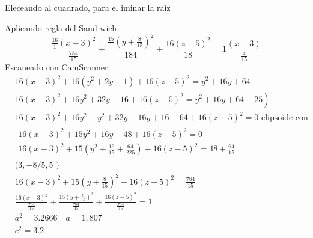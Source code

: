 Eleceando al cuadrado, para el iminar la raíz

Aplicando regla del Sand wich
$$
\frac{\frac{16}{1}(x-3)^2}{\frac{784}{15}}+\frac{\frac{15}{1}\left(y+\frac{8}{15}\right)^2}{184}+\frac{16(z-5)^2}{18}=1 \frac{(x-3)}{\frac{4}{15}}
$$
Escaneado con CamScanner
$$
\begin{aligned}
	& 16(x-3)^2+16\left(y^2+2 y+1\right)+16(z-5)^2=y^2+16 y+64 \\
	& \left.16(x-3)^2+16 y^2+32 y+16+16(z-5)^2=y^2+16 y+64+25\right) \\
	& 16(x-3)^2+16 y^2-y^2+32 y-16 y+16-64+16(z-5)^2=0 \text { elipsoide con } \\
	& \begin{array}{l}
		16(x-3)^2+15 y^2+16 y-48+16(z-5)^2=0 \\
		16(x-3)^2+15\left(y^2+\frac{16}{15}+\frac{64}{225}\right)+16(z-5)^2=48+\frac{64}{15}
	\end{array} \\
	& (3,-8 / 5,5 \text { ) } \\
	& 16(x-3)^2+15\left(y+\frac{8}{15}\right)^2+16(z-5)^2=\frac{784}{15} \\
	& \frac{16(x-3)^2}{\frac{784}{15}}+\frac{15\left(y+\frac{8}{15}\right)^2}{\frac{784}{15}}+\frac{16(z-5)^2}{\frac{784}{15}}=1 \\
	& a^2=3.2666 \quad a=1,807 \\
	& c^2=3.2
\end{aligned}
$$




